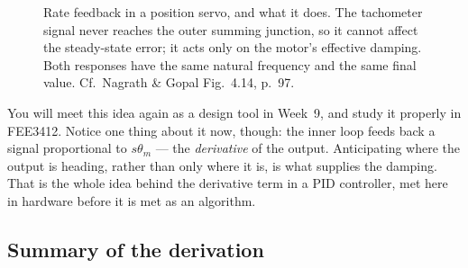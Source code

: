 \documentclass[11pt,a4paper]{article}
\begin{document}
\begin{figure}[H]
\vspace{4mm}
\caption{Rate feedback in a position servo, and what it does. The tachometer
signal never reaches the outer summing junction, so it cannot affect the
steady-state error; it acts only on the motor's effective damping. Both
responses have the same natural frequency and the same final value. Cf.\
Nagrath \& Gopal Fig.~4.14, p.~97.}
\label{fig:ratefb}
\end{figure}

You will meet this idea again as a design tool in Week~9, and study it
properly in FEE3412. Notice one thing about it now, though: the inner loop
feeds back a signal proportional to $s\theta_{m}$ --- the \emph{derivative} of
the output. Anticipating where the output is heading, rather than only where it
is, is what supplies the damping. That is the whole idea behind the derivative
term in a PID controller, met here in hardware before it is met as an
algorithm.

\subsection*{Summary of the derivation}
\end{document}

